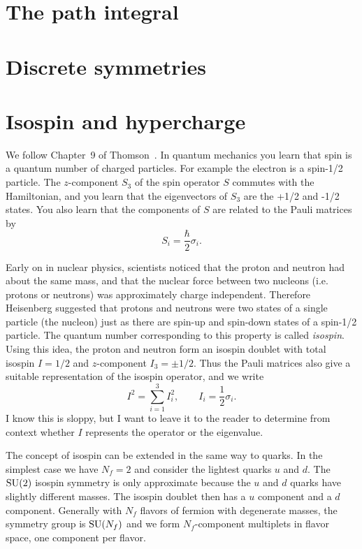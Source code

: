 \section{The path integral}

\section{Discrete symmetries}\label{sec:discreteSymm}

\section{Isospin and hypercharge}\label{sec:isohyper}

We follow Chapter~9 of 
Thomson~\cite{thomson_modern_2013}. 
In quantum mechanics you learn that spin is a quantum number of
charged particles. For example the electron is a spin-1/2 particle. The
$z$-component $S_3$ of the spin operator $S$ commutes with the Hamiltonian, and
you learn that the eigenvectors of $S_3$ are the +1/2 and -1/2 states. You also
learn that the components of $S$ are related to the Pauli matrices by
\begin{equation}
  S_i=\frac{\hbar}{2}\sigma_i.
\end{equation}

Early on in nuclear physics, scientists noticed that the proton and neutron had
about the same mass, and that the nuclear force between two nucleons (i.e.
protons or neutrons) was approximately charge independent. Therefore Heisenberg
suggested that protons and neutrons were two states of a single particle (the
nucleon) just as there are spin-up and spin-down states of a spin-1/2
particle.
The quantum number corresponding to this property is called {\it isospin}.
Using this idea, the proton and neutron form an isospin doublet with total
isospin $I=1/2$ and $z$-component $I_3=\pm1/2$. Thus the Pauli matrices also
give a suitable representation of the isospin operator, and we write
\begin{equation}
  I^2=\sum\limits_{i=1}^3 I_i^2, \qquad I_i=\frac{1}{2}\sigma_i.
\end{equation}
I know this is sloppy, but I want to leave it to the reader to determine from
context whether $I$ represents the operator or the eigenvalue. 

The concept of isospin can be extended in the same way to quarks. 
In the simplest case we have $N_f=2$ and consider the lightest quarks
$u$ and $d$. The $\operatorname{SU}(2)$ isospin symmetry is only approximate because 
the $u$ and $d$ quarks have slightly different masses. The isospin 
doublet then has a $u$ component and a $d$ component. Generally with
$N_f$ flavors of fermion with degenerate masses, the symmetry group is 
$\operatorname{SU}(N_f)$ and we
form $N_f$-component multiplets in flavor space, one component per flavor.

